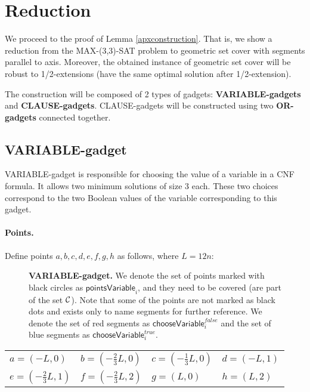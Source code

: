 \section{Reduction}
\label{construction_description}
We proceed to the proof of Lemma \ref{apxconstruction}.
That is, we show a reduction from the MAX-(3,3)-SAT problem
to geometric set cover with segments
parallel to axis. Moreover, the obtained instance
of geometric set cover will be robust
to 1/2-extensions (have the same optimal solution
after 1/2-extension).

The construction will be composed of 2 types of gadgets:
\textbf{VARIABLE-gadgets} and \textbf{CLAUSE-gadgets}.
CLAUSE-gadgets will be constructed using two \textbf{OR-gadgets}
connected together.

\subsection{VARIABLE-gadget}

VARIABLE-gadget is responsible for choosing the value of a variable
in a CNF formula. It allows two minimum solutions of size 3 each.
These two choices correspond to the two Boolean values of the variable
corresponding to this gadget.

\paragraph{Points.}

Define points $a,b,c,d,e,f,g,h$ as follows, where $L = 12n$:


\newcommand{\pointsVarNoArg}{\mathsf{pointsVariable} }
\newcommand{\pointsVar}[1]{\mathsf{pointsVariable}_{#1} }
\newcommand{\chooseVar}[2]{\mathsf{chooseVariable}^{#1}_{#2} }
\newcommand{\segmentsVar}[1]{\mathsf{segmentsVariable}_{#1} }

\begin{figure}[h]
\centering
\def\svgwidth{0.5\columnwidth}

\caption{\textbf{VARIABLE-gadget.}
We denote the set of points marked with black circles as $\pointsVar{i}$,
and they need to be covered (are part of the set $\mathcal{C}$).
Note that some of the points are not marked as black dots
and exists only to name segments for further reference.
We denote the set of red segments as $\chooseVar{false}{i}$
and the set of blue segments as $\chooseVar{true}{i}$.}
\label{fig:apx_choose_variable}
\end{figure}

\begin{center}
\begin{tabular}{ l l l l}
	$a = (-L, 0)$ &
	$b = (-\frac{2}{3}L, 0)$ & 
	$c = (-\frac{1}{3}L, 0)$ & 
	$d = (-L, 1)$ \\  
	$e = (-\frac{2}{3}L, 1)$ & 
	$f = (-\frac{2}{3}L, 2)$ &
	$g = (L, 0)$ &
	$h = (L, 2)$
\end{tabular}
\end{center}


